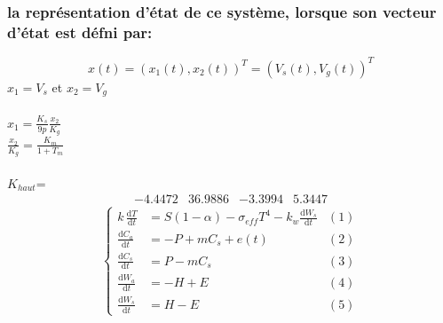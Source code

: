 \documentclass[12pt, a4paper, openany]{report}
\begin{document}
\subsubsection{la représentation d’état de ce système, lorsque son vecteur d’état est défni par:}


\begin{equation}
x(t)={(x_1(t),x_2(t))}^T={(V_s(t),V_g(t))}^T
\end{equation}
$x_1=V_s$ et $x_2=V_g$
\\\\


$x_1=\frac{K_s}{9p}\frac{x_2}{K_g}$\\
$\frac{x_2}{K_g}=\frac{K_m}{1+T_m}$
\\
\\
$K_{haut}$=
$$
\begin{matrix}
-4.4472 &  36.9886  & -3.3994 &   5.3447
\end{matrix} 
$$     
\begin{equation*}
      \left\{
         \begin{aligned}
           k\,\frac{\mathrm{d}T}{\mathrm{d}t}&=S(1-\alpha)-\sigma_{eff}T^4-k_w\frac{\mathrm{d}W_s}{\mathrm{d}t} & (1)\\
           \frac{\mathrm{d}C_a}{\mathrm{d}t}&=-P+mC_s+e(t) & (2) \\
           \frac{\mathrm{d}C_s}{\mathrm{d}t}&=P-mC_s & (3) \\
           \frac{\mathrm{d}W_a}{\mathrm{d}t}&=-H+E & (4) \\
           \frac{\mathrm{d}W_s}{\mathrm{d}t}&=H-E & (5)
         \end{aligned}
      \right.
    \end{equation*}


\end{document}
